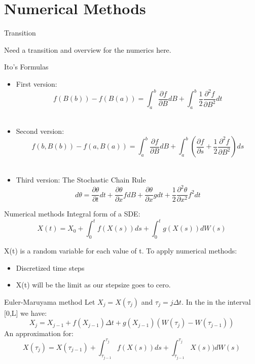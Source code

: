 
\section{Numerical Methods}

\begin{frame}{Transition}

  Need a transition and overview for the numerics here.
  
\end{frame}

\begin{frame}{Ito's Formulas}
  	\begin{itemize}
   		\item First version: $$f(B(b))-f(B(a))=\int_{a}^{b}{\frac{\partial f}{\partial B} 				dB}+\int_{a}^{b}{\frac{1}{2} \frac{\partial^2 f}{\partial B^2} dt} $$\\
    		\item Second version: $$f(b,B(b))-f(a,B(a))=\int_{a}^{b}{\frac{\partial f}{\partial B} 			dB}+\int_{a}^{b}{(\frac{\partial f}{\partial s}+\frac{1}{2}\frac{\partial ^2 f}{\partial 		B^2}) ds}$$\\
  		\item  Third version: The Stochastic Chain Rule $$d\theta=\frac{\partial\theta}{\partial 		t}dt+\frac{\partial\theta}{\partial x}f dB+\frac{\partial\theta}{\partial x}g 					dt+\frac{1}{2}\frac{\partial^2\theta}{\partial x^2}f^2dt$$
  	\end{itemize}
\end{frame}

\begin{frame}{Numerical methods}
Integral form of a SDE: 
$$X(t)=X_0+\int_{0}^{t}f(X(s))ds+\int_{0}^{t}g(X(s))dW(s)$$

X(t) is a random variable for each value of t. To apply numerical methods:
	\begin{itemize}
		\item Discretized time steps	
		\item X(t) will be the limit as our stepsize goes to cero.
	\end{itemize}
\end{frame}

\begin{frame}{Euler-Maruyama method}
Let $X_j=X(\tau_j)$ and $\tau_j=j\Delta t$. In the in the interval [0,L] we have:\bigskip\\
$$X_j=X_{j-1}+f(X_{j-1})\Delta t+g(X_{j-1})(W(\tau_j)-W(\tau_{j-1}))$$
 An approximation for:
$$X(\tau_j)=X(\tau_{j-1})+\int_{\tau_{j-1}}^{\tau_{j}}f(X(s))ds+\int_
{\tau_{j-1}}^{\tau_{j}}X(s))dW(s)$$
\end{frame}

